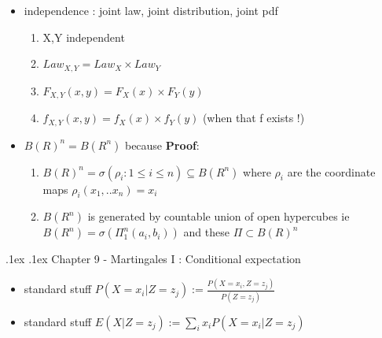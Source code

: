 \documentclass[10pt,landscape,a4paper]{article}
\makeatletter
\renewcommand{\section}{\@startsection{section}{1}{0mm}%
                                {.1ex}%
                                {.1ex}%
                                {\color{blue}\sffamily\small\bfseries}}
\makeatother
\begin{document}
\begin{multicols*}{3}
\begin{spacing}{0.5}
\begin{itemize}
\item \colorbox{green!10}{independence : joint law, joint distribution, joint pdf} 
\begin{enumerate}
\item X,Y independent
\item $Law_{X,Y} = Law_{X} \times Law_{Y}$
\item $F_{X,Y}(x,y) = F_{X}(x) \times F_{Y}(y)$
\item $f_{X,Y}(x,y) = f_{X}(x) \times f_{Y}(y)$ (when that f exists !)
\end{enumerate}

\item \colorbox{green!10}{$B(R)^n = B(R^n)$} because \textbf{Proof}:
\begin{enumerate}
\item $B(R)^n = \sigma(\rho_i : 1 \le i \le n)\subseteq B(R^n)$ where $\rho_i$ are the coordinate maps $\rho_i(x_1,..x_n)=x_i$
\item $B(R^n)$ is generated by countable union of open hypercubes ie $B(R^n)=\sigma(\Pi_{1}^{n}(a_i,b_i))$ and these $\Pi \subset B(R)^n$
\end{enumerate}


\end{itemize}

\section{Chapter 9 - Martingales I : Conditional expectation }

\begin{itemize}
\item standard stuff $P(X=x_i|Z=z_j) := \frac{P(X=x_i,Z=z_j)}{P(Z=z_j)}$
\item standard stuff $E(X|Z=z_j) := \sum_i x_i P(X=x_i|Z=z_j)$

\end{itemize}
\end{spacing}
\end{multicols*}
\end{document}
